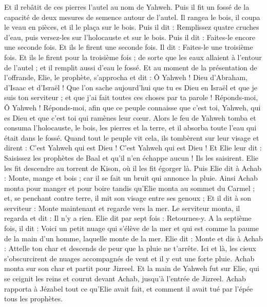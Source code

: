 \begin{multicols}{2}
Et il rebâtit de ces pierres l'autel au nom de Yahweh. Puis il fit un fossé de la capacité de deux mesures de semence autour de l'autel.
Il rangea le bois, il coupa le veau en pièces, et il le plaça sur le bois.
Puis il dit : Remplissez quatre cruches d'eau, puis versez-les sur l'holocauste et sur le bois. Puis il dit : Faites-le encore une seconde fois. Et ils le firent une seconde fois. Il dit : Faites-le une troisième fois. Et ils le firent pour la troisième fois ;
de sorte que les eaux allaient à l'entour de l'autel ; et il remplit aussi d’eau le fossé.
Et au moment de la présentation de l’offrande, Elie, le prophète, s'approcha et dit : Ô Yahweh ! Dieu d'Abraham, d'Isaac et d'Israël ! Que l’on sache aujourd'hui que tu es Dieu en Israël et que je suis ton serviteur ; et que j'ai fait toutes ces choses par ta parole !
Réponds-moi, Ô Yahweh ! Réponds-moi, afin que ce peuple connaisse que c’est toi, Yahweh, qui es Dieu et que c'est toi qui ramènes leur cœur.
Alors le feu de Yahweh tomba et consuma l'holocauste, le bois, les pierres et la terre, et il absorba toute l'eau qui était dans le fossé.
Quand tout le peuple vit cela, ils tombèrent sur leur visage et dirent : C'est Yahweh qui est Dieu ! C'est Yahweh qui est Dieu !
Et Elie leur dit : Saisissez les prophètes de Baal et qu'il n'en échappe aucun ! Ils les saisirent. Elie les fit descendre au torrent de Kison, où il les fit égorger là.
Puis Elie dit à Achab : Monte, mange et bois ; car il se fait un bruit qui annonce la pluie.
Ainsi Achab monta pour manger et pour boire tandis qu’Elie monta au sommet du Carmel ; et, se penchant contre terre, il mit son visage entre ses genoux ;
Et il dit à son serviteur : Monte maintenant et regarde vers la mer. Le serviteur monta, il regarda et dit : Il n'y a rien. Elie dit par sept fois : Retournes-y.
A la septième fois, il dit : Voici un petit nuage qui s’élève de la mer et qui est comme la paume de la main d'un homme, laquelle monte de la mer. Elie dit : Monte et dis à Achab : Attelle ton char et descends de peur que la pluie ne t’arrête.
Ici et là, les cieux s'obscurcirent de nuages accompagnés de vent et il y eut une forte pluie. Achab monta sur son char et partit pour Jizreel.
Et la main de Yahweh fut sur Elie, qui se ceignit les reins et courut devant Achab, jusqu'à l'entrée de Jizreel.
\VerseOne{}Achab rapporta à Jézabel tout ce qu'Elie avait fait, et comment il avait tué par l'épée tous les prophètes.

\end{multicols}
